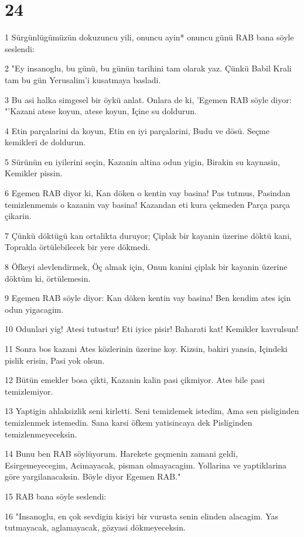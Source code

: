 \chapter{24}

\par 1 Sürgünlügümüzün dokuzuncu yili, onuncu ayin* onuncu günü RAB bana söyle seslendi:
\par 2 "Ey insanoglu, bu günü, bu günün tarihini tam olarak yaz. Çünkü Babil Krali tam bu gün Yerusalim'i kusatmaya basladi.
\par 3 Bu asi halka simgesel bir öykü anlat. Onlara de ki, 'Egemen RAB söyle diyor: "'Kazani atese koyun, atese koyun, Içine su doldurun.
\par 4 Etin parçalarini da koyun, Etin en iyi parçalarini, Budu ve dösü. Seçme kemikleri de doldurun.
\par 5 Sürünün en iyilerini seçin, Kazanin altina odun yigin, Birakin su kaynasin, Kemikler pissin.
\par 6 Egemen RAB diyor ki, Kan döken o kentin vay basina! Pas tutmus, Pasindan temizlenmemis o kazanin vay basina! Kazandan eti kura çekmeden Parça parça çikarin.
\par 7 Çünkü döktügü kan ortalikta duruyor; Çiplak bir kayanin üzerine döktü kani, Toprakla örtülebilecek bir yere dökmedi.
\par 8 Öfkeyi alevlendirmek, Öç almak için, Onun kanini çiplak bir kayanin üzerine döktüm ki, örtülemesin.
\par 9 Egemen RAB söyle diyor: Kan döken kentin vay basina! Ben kendim ates için odun yigacagim.
\par 10 Odunlari yig! Atesi tutustur! Eti iyice pisir! Baharati kat! Kemikler kavrulsun!
\par 11 Sonra bos kazani Ates közlerinin üzerine koy. Kizsin, bakiri yansin, Içindeki pislik erisin, Pasi yok olsun.
\par 12 Bütün emekler bosa çikti, Kazanin kalin pasi çikmiyor. Ates bile pasi temizlemiyor.
\par 13 Yaptigin ahlaksizlik seni kirletti. Seni temizlemek istedim, Ama sen pisliginden temizlenmek istemedin. Sana karsi öfkem yatisincaya dek Pisliginden temizlenmeyeceksin.
\par 14 Bunu ben RAB söylüyorum. Harekete geçmenin zamani geldi, Esirgemeyecegim, Acimayacak, pisman olmayacagim. Yollarina ve yaptiklarina göre yargilanacaksin. Böyle diyor Egemen RAB."
\par 15 RAB bana söyle seslendi:
\par 16 "Insanoglu, en çok sevdigin kisiyi bir vurusta senin elinden alacagim. Yas tutmayacak, aglamayacak, gözyasi dökmeyeceksin.

